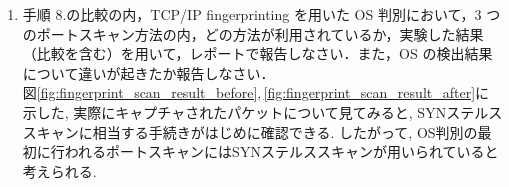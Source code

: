 \begin{enumerate}[label=(\arabic*.),leftmargin=*]
\begin{enumerate}[label=\arabic*., leftmargin=*]
            
        \item 手順 8.の比較の内，TCP/IP fingerprinting を用いた OS 判別において，3 つのポートスキャン方法の内，どの方法が利用されているか，実験した結果（比較を含む）を用いて，レポートで報告しなさい．また，OS の検出結果について違いが起きたか報告しなさい．\\
            
            \quad
            図\ref{fig:fingerprint_scan_result_before},\,\ref{fig:fingerprint_scan_result_after}に示した,
            実際にキャプチャされたパケットについて見てみると,
            SYNステルススキャンに相当する手続きがはじめに確認できる.
            したがって, OS判別の最初に行われるポートスキャンにはSYNステルススキャンが用いられていると考えられる.
            
    \end{enumerate}
\end{enumerate}


\newpage


% 